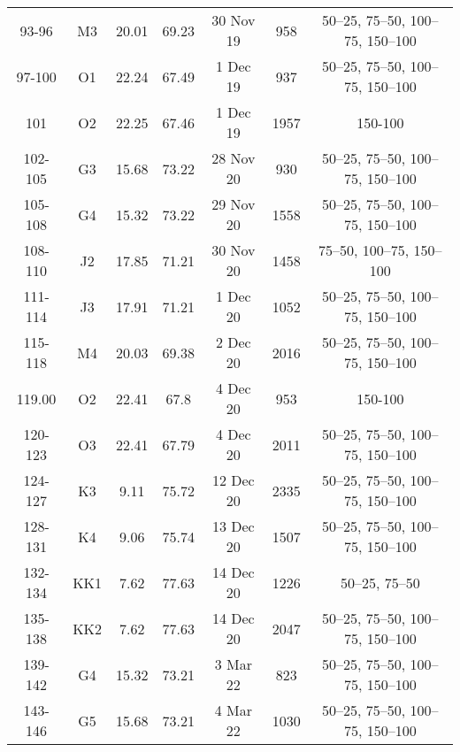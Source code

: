 \begin{table}[htbp]
{\begin{adjustwidth}{0.5in}{0in}
\begin{tabular}{ccccccc}
				93-96         & M3  & 20.01      & 69.23      & 30 Nov 19                 & 958        & 50–25, 75–50, 100–75, 150–100 \\
				97-100        & O1  & 22.24      & 67.49      & 1 Dec 19                  & 937        & 50–25, 75–50, 100–75, 150–100 \\
				101        & O2  & 22.25      & 67.46      & 1 Dec 19                  & 1957       & 150-100                       \\
				\midrule
				102-105       & G3  & 15.68      & 73.22      & 28 Nov 20                 & 930        & 50–25, 75–50, 100–75, 150–100 \\
				105-108       & G4  & 15.32      & 73.22      & 29 Nov 20                 & 1558       & 50–25, 75–50, 100–75, 150–100 \\
				108-110       & J2  & 17.85      & 71.21      & 30 Nov 20                 & 1458       & 75–50, 100–75, 150–100        \\
				111-114       & J3  & 17.91      & 71.21      & 1 Dec 20                  & 1052       & 50–25, 75–50, 100–75, 150–100 \\
				115-118       & M4  & 20.03      & 69.38      & 2 Dec 20                  & 2016       & 50–25, 75–50, 100–75, 150–100 \\
				119.00        & O2  & 22.41      & 67.8       & 4 Dec 20                  & 953        & 150-100                       \\
				120-123       & O3  & 22.41      & 67.79      & 4 Dec 20                  & 2011       & 50–25, 75–50, 100–75, 150–100 \\
				124-127       & K3  & 9.11       & 75.72      & 12 Dec 20                 & 2335       & 50–25, 75–50, 100–75, 150–100 \\
				128-131       & K4  & 9.06       & 75.74      & 13 Dec 20                 & 1507       & 50–25, 75–50, 100–75, 150–100 \\
				132-134       & KK1 & 7.62       & 77.63      & 14 Dec 20                 & 1226       & 50–25, 75–50                  \\
				135-138       & KK2 & 7.62       & 77.63      & 14 Dec 20                 & 2047       & 50–25, 75–50, 100–75, 150–100 \\
				\midrule
				139-142       & G4  & 15.32      & 73.21      & 3 Mar 22                  & 823        & 50–25, 75–50, 100–75, 150–100 \\
				143-146       & G5  & 15.68      & 73.21      & 4 Mar 22                  & 1030       & 50–25, 75–50, 100–75, 150–100 \\

\end{tabular}
\end{adjustwidth}}
\end{table}
